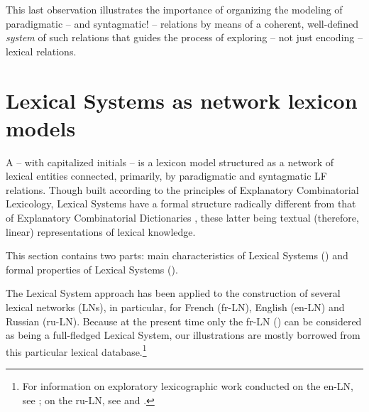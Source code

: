 This last observation illustrates the importance of organizing the modeling of paradigmatic -- and syntagmatic! -- relations by means of a coherent, well-defined \emph{system} of such relations that guides the process of exploring -- not just encoding -- lexical relations.

\section{Lexical Systems as network lexicon models}\label{sec:LexicalSystems}

A  \parencite{Polguere2009-e,Polguere2014c-e} -- with capitalized initials -- is a lexicon model structured as a network of lexical entities connected, primarily, by paradigmatic and syntagmatic LF relations. Though built according to the principles of Explanatory Combinatorial Lexicology, Lexical Systems have a formal structure radically different from that of Explanatory Combinatorial Dictionaries \parencite{MelcukZholkovsky1984,MelcukZolkovskij2016,MelcukEtAl1984,MelcukEtAl1988,MelcukEtAl1992,MelcukEtAl1999}, these latter being textual (therefore, linear) representations of lexical knowledge.

This section contains two parts: main characteristics of Lexical Systems () and formal properties of Lexical Systems ().

The Lexical System approach has been applied to the construction of several lexical networks (LNs), in particular, for French (fr-LN), English (en-LN) and Russian (ru-LN). Because at the present time only the fr-LN () can be considered as being a full-fledged Lexical System, our illustrations are mostly borrowed from this particular lexical database.\footnote{For information on exploratory lexicographic work conducted on the en-LN, see \textcite{GaderEtAl2014a-e}; on the ru-LN, see \textcite{Krylosova2017-e} and \textcite{Mikhel2022b}.}

